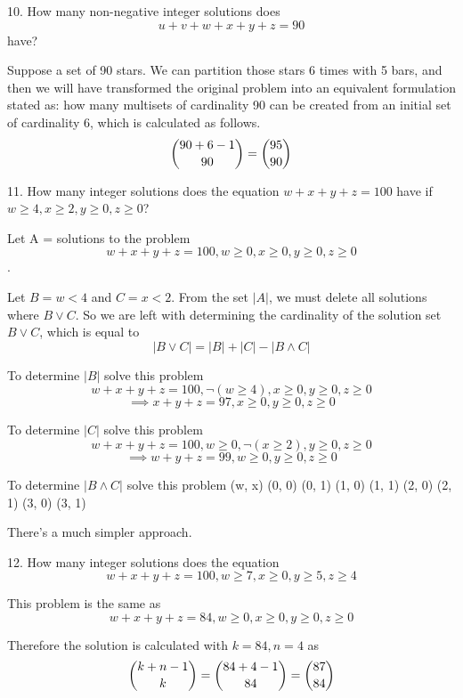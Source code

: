 \documentclass{hippoidC}
\begin{document}
\begin{prooflist}{10. How many non-negative integer solutions does $$u + v+ w+ x+
    y+ z = 90$$ have?}
\item Suppose a set of 90 stars.  We can partition those stars 6 times with 5
    bars, and then we will have transformed the original problem into an
    equivalent formulation stated as: how many multisets of cardinality 90 can
    be created from an initial set of cardinality 6, which is calculated as
    follows.
    $$ \dbinom{90+6-1}{90} = \dbinom{95}{90}$$
\end{prooflist}

\begin{prooflist}{11. How many integer solutions does the equation
        $w + x + y+ z = 100$ have if $w \geq 4, x \geq 2, y \geq 0, z \geq 0$?}
\item Let A = solutions to the problem
    $$w + x + y+ z = 100, w \geq 0, x \geq 0, y \geq 0, z \geq 0$$.
\item Let $B=w<4$ and $C=x<2$. From the set $|A|$, we must delete all solutions
    where $B\lor C$. So we are left with determining the cardinality of the
    solution set $B \lor C$, which is equal to
    $$
        |B\lor C| = |B| + |C| - |B\land C|
    $$
\item To determine $|B|$ solve this problem
$$w + x + y+ z = 100, \neg(w \geq 4), x \geq 0, y \geq 0, z \geq 0$$
$$\implies x + y+ z = 97, x \geq 0, y \geq 0, z \geq 0$$

\item To determine $|C|$ solve this problem
$$w + x + y+ z = 100, w \geq 0, \neg(x \geq 2), y \geq 0, z \geq 0$$
$$\implies w + y+ z = 99, w \geq 0, y \geq 0, z \geq 0$$

\item To determine $|B\land C|$ solve this problem
    (w, x)
    (0, 0)
    (0, 1)
    (1, 0)
    (1, 1)
    (2, 0)
    (2, 1)
    (3, 0)
    (3, 1)
\item There's a much simpler approach.
\end{prooflist}

\begin{prooflist}{12. How many integer solutions does the equation
        $$w + x + y+ z = 100, w \geq 7, x \geq 0, y \geq 5, z \geq 4$$
    }
\item This problem is the same as
        $$w + x + y+ z = 84, w \geq 0, x \geq 0, y \geq 0, z \geq 0$$
    \item Therefore the solution is calculated with $k=84, n=4$ as
    $$ \dbinom{k+n-1}{k} = \dbinom{84+4-1}{84}=\dbinom{87}{84}$$
\end{prooflist}
\end{document}
